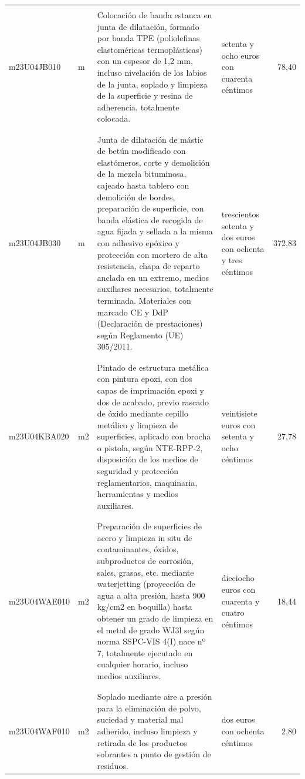 \documentclass{book}%
\begin{document}
\begin{supertabular}{|l|l|p{5cm}|p{3cm}|r|}
&&&&\\%
m23U04JB010&m&Colocación de banda estanca en junta de dilatación, formado por banda TPE (poliolefinas elastoméricas termoplásticas) con un espesor de 1,2 mm, incluso nivelación de los labios de la junta, soplado y limpieza de la superficie y resina de adherencia, totalmente colocada.&setenta y ocho euros con cuarenta céntimos&78,40\\%
&&&&\\%
&&&&\\%
m23U04JB030&m&Junta de dilatación de mástic de betún modificado con elastómeros, corte y demolición de la mezcla bituminosa, cajeado hasta tablero con demolición de bordes, preparación de superficie, con banda elástica de recogida de agua fijada y sellada a la misma con adhesivo epóxico y protección con mortero de alta resistencia, chapa de reparto anclada en un extremo, medios auxiliares necesarios, totalmente terminada. Materiales con marcado CE y DdP (Declaración de prestaciones) según Reglamento (UE) 305/2011.&trescientos setenta y dos euros con ochenta y tres céntimos&372,83\\%
&&&&\\%
&&&&\\%
m23U04KBA020&m2&Pintado de estructura metálica con pintura epoxi, con dos capas de imprimación epoxi y dos de acabado, previo rascado de óxido mediante cepillo metálico y limpieza de superficies, aplicado con brocha o pistola, según NTE{-}RPP{-}2, disposición de los medios de seguridad y protección reglamentarios, maquinaria, herramientas y medios auxiliares.&veintisiete euros con setenta y ocho céntimos&27,78\\%
&&&&\\%
&&&&\\%
m23U04WAE010&m2&Preparación de superficies de acero y limpieza in situ de contaminantes, óxidos, subproductos de corrosión, sales, grasas, etc. mediante waterjetting (proyección de agua a alta presión, hasta 900 kg/cm2 en boquilla) hasta obtener un grado de limpieza en el metal de grado WJ3l según norma SSPC{-}VIS 4(I) nace nº 7, totalmente ejecutado en cualquier horario, incluso medios auxiliares.&dieciocho euros con cuarenta y cuatro céntimos&18,44\\%
&&&&\\%
&&&&\\%
m23U04WAF010&m2&Soplado mediante aire a presión para la eliminación de polvo, suciedad y material mal adherido, incluso limpieza y retirada de los productos sobrantes a punto de gestión de residuos.&dos euros con ochenta céntimos&2,80\\%

\end{supertabular}
\end{document}
